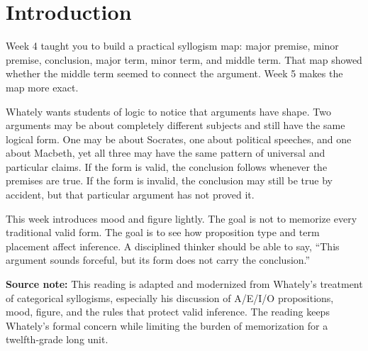 \documentclass[12pt]{article}
\newcommand{\focusbox}[1]{\par\vspace{0.4em}\noindent\begingroup\setlength{\fboxsep}{6pt}\colorbox{gray!12}{\begin{minipage}{\dimexpr\linewidth-2\fboxsep\relax}#1\end{minipage}}\endgroup\par\vspace{0.5em}}
\begin{document}
\section*{Introduction}
Week 4 taught you to build a practical syllogism map: major premise, minor premise, conclusion, major term, minor term, and middle term. That map showed whether the middle term seemed to connect the argument. Week 5 makes the map more exact.

Whately wants students of logic to notice that arguments have shape. Two arguments may be about completely different subjects and still have the same logical form. One may be about Socrates, one about political speeches, and one about Macbeth, yet all three may have the same pattern of universal and particular claims. If the form is valid, the conclusion follows whenever the premises are true. If the form is invalid, the conclusion may still be true by accident, but that particular argument has not proved it.

This week introduces mood and figure lightly. The goal is not to memorize every traditional valid form. The goal is to see how proposition type and term placement affect inference. A disciplined thinker should be able to say, ``This argument sounds forceful, but its form does not carry the conclusion.''

\focusbox{\textbf{Source note:} This reading is adapted and modernized from Whately's treatment of categorical syllogisms, especially his discussion of A/E/I/O propositions, mood, figure, and the rules that protect valid inference. The reading keeps Whately's formal concern while limiting the burden of memorization for a twelfth-grade long unit.}
\end{document}
